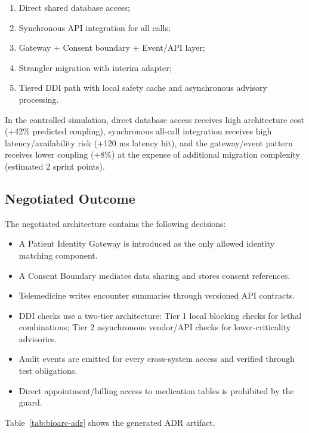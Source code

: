 \documentclass[english,preprint,nonatbib]{elsarticle}
\begin{document}
\begin{enumerate}[leftmargin=2em]
  \item Direct shared database access;
  \item Synchronous API integration for all calls;
  \item Gateway + Consent boundary + Event/API layer;
  \item Strangler migration with interim adapter;
  \item Tiered DDI path with local safety cache and asynchronous advisory processing.
\end{enumerate}

In the controlled simulation, direct database access receives high architecture cost (+42\% predicted coupling), synchronous all-call integration receives high latency/availability risk (+120 ms latency hit), and the gateway/event pattern receives lower coupling (+8\%) at the expense of additional migration complexity (estimated 2 sprint points).

\subsection{Negotiated Outcome}

The negotiated architecture contains the following decisions:

\begin{itemize}[leftmargin=2em]
  \item A Patient Identity Gateway is introduced as the only allowed identity matching component.
  \item A Consent Boundary mediates data sharing and stores consent references.
  \item Telemedicine writes encounter summaries through versioned API contracts.
  \item DDI checks use a two-tier architecture: Tier 1 local blocking checks for lethal combinations;
Tier 2 asynchronous vendor/API checks for lower-criticality advisories.
  \item Audit events are emitted for every cross-system access and verified through test obligations.
  \item Direct appointment/billing access to medication tables is prohibited by the guard.
\end{itemize}

Table~\ref{tab:bioarc-adr} shows the generated ADR artifact.
\end{document}
